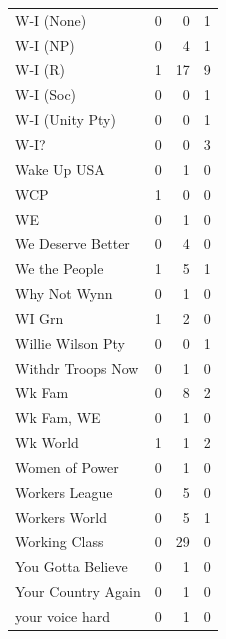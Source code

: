 \begin{supertabular}{lrrr}
W-I (None) & 0 & 0 & 1\\
W-I (NP) & 0 & 4 & 1\\
W-I (R) & 1 & 17 & 9\\
W-I (Soc) & 0 & 0 & 1\\
W-I (Unity Pty) & 0 & 0 & 1\\
W-I? & 0 & 0 & 3\\
Wake Up USA & 0 & 1 & 0\\
WCP & 1 & 0 & 0\\
WE & 0 & 1 & 0\\
We Deserve Better & 0 & 4 & 0\\
We the People & 1 & 5 & 1\\
Why Not Wynn & 0 & 1 & 0\\
WI Grn & 1 & 2 & 0\\
Willie Wilson Pty & 0 & 0 & 1\\
Withdr Troops Now & 0 & 1 & 0\\
Wk Fam & 0 & 8 & 2\\
Wk Fam, WE & 0 & 1 & 0\\
Wk World & 1 & 1 & 2\\
Women of Power & 0 & 1 & 0\\
Workers League & 0 & 5 & 0\\
Workers World & 0 & 5 & 1\\
Working Class & 0 & 29 & 0\\
You Gotta Believe & 0 & 1 & 0\\
Your Country Again & 0 & 1 & 0\\
your voice hard & 0 & 1 & 0\\
\bottomrule
\end{supertabular}
